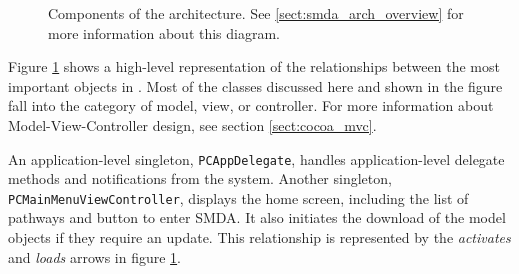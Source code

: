 \begin{figure}[p]
    \caption{\label{fig:maw_components} Components of the architecture. See
    \ref{sect:smda_arch_overview} for more information about this diagram.}
\end{figure}

Figure \ref{fig:maw_components} shows a high-level representation of the
relationships between the most important objects in \mawapp. Most of the classes
discussed here and shown in the figure fall into the category of model, view, or
controller. For more information about Model-View-Controller design, see section
\ref{sect:cocoa_mvc}.

An application-level singleton, \texttt{PCAppDelegate}, handles
application-level delegate methods and notifications from the system. Another
singleton, \texttt{PCMainMenuViewController}, displays the home screen,
including the list of pathways and button to enter SMDA. It also initiates the
download of the model objects if they require an update. This relationship is
represented by the \emph{activates} and \emph{loads} arrows in figure
\ref{fig:maw_components}.

